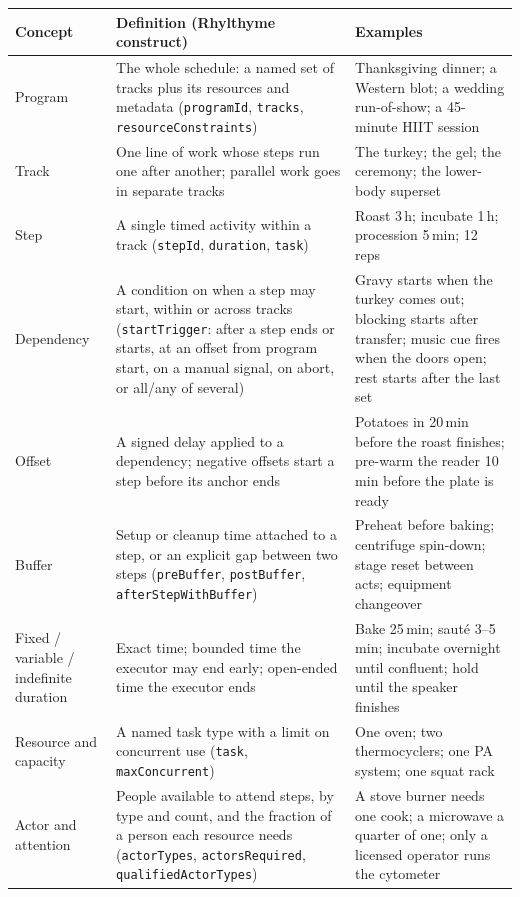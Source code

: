 \documentclass[10pt]{article}
\newcommand{\rt}{Rhylthyme}
\newcommand{\code}[1]{\texttt{#1}}
\begin{document}
\begin{table}[tbp]
  \centering\footnotesize
  \setlength{\tabcolsep}{4pt}
  \begin{tabular}{@{}R{2.2cm}R{5.6cm}R{8.6cm}@{}}
    \toprule
    Concept & Definition (\rt{} construct) & Examples \\
    \midrule
    Program & The whole schedule: a named set of tracks plus its resources and metadata (\code{programId}, \code{tracks}, \code{resourceConstraints}) & Thanksgiving dinner; a Western blot; a wedding run-of-show; a 45-minute HIIT session \\
    Track & One line of work whose steps run one after another; parallel work goes in separate tracks & The turkey; the gel; the ceremony; the lower-body superset \\
    Step & A single timed activity within a track (\code{stepId}, \code{duration}, \code{task}) & Roast 3\,h; incubate 1\,h; procession 5\,min; 12 reps \\
    Dependency & A condition on when a step may start, within or across tracks (\code{startTrigger}: after a step ends or starts, at an offset from program start, on a manual signal, on abort, or all/any of several) & Gravy starts when the turkey comes out; blocking starts after transfer; music cue fires when the doors open; rest starts after the last set \\
    Offset & A signed delay applied to a dependency; negative offsets start a step before its anchor ends & Potatoes in 20\,min before the roast finishes; pre-warm the reader 10\,min before the plate is ready \\
    Buffer & Setup or cleanup time attached to a step, or an explicit gap between two steps (\code{preBuffer}, \code{postBuffer}, \code{afterStepWithBuffer}) & Preheat before baking; centrifuge spin-down; stage reset between acts; equipment changeover \\
    Fixed / variable / indefinite duration & Exact time; bounded time the executor may end early; open-ended time the executor ends & Bake 25\,min; saut\'e 3--5\,min; incubate overnight until confluent; hold until the speaker finishes \\
    Resource and capacity & A named task type with a limit on concurrent use (\code{task}, \code{maxConcurrent}) & One oven; two thermocyclers; one PA system; one squat rack \\
    Actor and attention & People available to attend steps, by type and count, and the fraction of a person each resource needs (\code{actorTypes}, \code{actorsRequired}, \code{qualifiedActorTypes}) & A stove burner needs one cook; a microwave a quarter of one; only a licensed operator runs the cytometer \\

\end{tabular}
\end{table}
\end{document}
